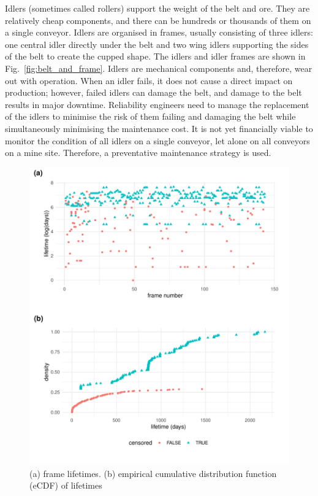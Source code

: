 Idlers (sometimes called rollers) support the weight of the belt and ore. They are relatively cheap components, and there can be hundreds or thousands of them on a single conveyor. Idlers are organised in frames, usually consisting of three idlers: one central idler directly under the belt and two wing idlers supporting the sides of the belt to create the cupped shape. The idlers and idler frames are shown in Fig.~\ref{fig:belt_and_frame}. Idlers are mechanical components and, therefore, wear out with operation. When an idler fails, it does not cause a direct impact on production; however, failed idlers can damage the belt, and damage to the belt results in major downtime. Reliability engineers need to manage the replacement of the idlers to minimise the risk of them failing and damaging the belt while simultaneously minimising the maintenance cost. It is not yet financially viable to monitor the condition of all idlers on a single conveyor, let alone on all conveyors on a mine site. Therefore, a preventative maintenance strategy is used.

\begin{figure}
  \centering
  \includegraphics[width=1\textwidth]{./figures/idler_data_desc.pdf}
  \caption{(a) frame lifetimes. (b) empirical cumulative distribution function (eCDF) of lifetimes}
  \label{fig:idler-data}
\end{figure}

